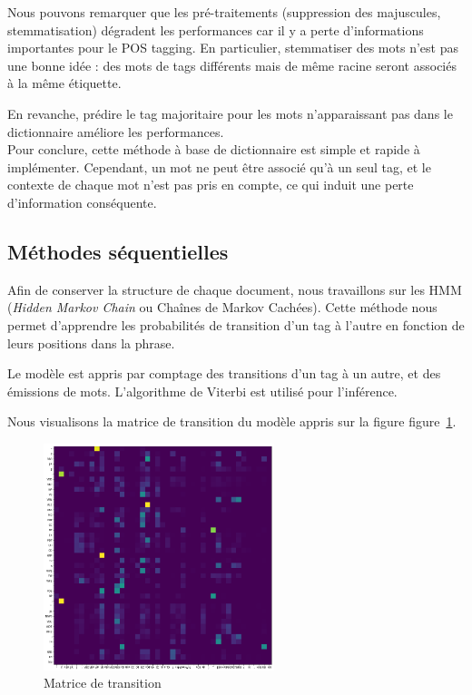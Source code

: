 \documentclass[a4paper]{article}
\newcommand{\figref}[1]{figure~\ref{#1}}
\begin{document}
Nous pouvons remarquer que les pré-traitements (suppression des majuscules,
stemmatisation) dégradent les performances car il y a perte d'informations importantes
pour le POS tagging. En particulier, stemmatiser des mots n'est pas
une bonne idée : des mots de tags différents mais de même racine seront associés
à la même étiquette.

En revanche, prédire le tag majoritaire pour les mots n'apparaissant pas dans le
dictionnaire améliore les performances. \\

Pour conclure, cette méthode à base de dictionnaire est simple et rapide à
implémenter. Cependant, un mot ne peut être associé qu'à un seul tag, et le
contexte de chaque mot n'est pas pris en compte, ce qui induit une perte
d'information conséquente. \\

\subsection{Méthodes séquentielles}

Afin de conserver la structure de chaque document, nous travaillons sur les HMM
(\emph{Hidden Markov Chain} ou Chaînes de Markov Cachées). Cette méthode nous
permet d'apprendre les probabilités de transition d'un tag à l'autre en fonction
de leurs positions dans la phrase.

Le modèle est appris par comptage des transitions d'un tag à un autre, et des
émissions de mots. L'algorithme de Viterbi est utilisé pour l'inférence. 

Nous visualisons la matrice de transition du modèle appris sur la figure
\figref{img:tme1-transition-matrix}.

\begin{figure}[H]
	\center 
	\includegraphics[width=0.6\textwidth]{images/tme1/transition_matrix.png}
    \caption{Matrice de transition}
    \label{img:tme1-transition-matrix}
\end{figure}
\end{document}
